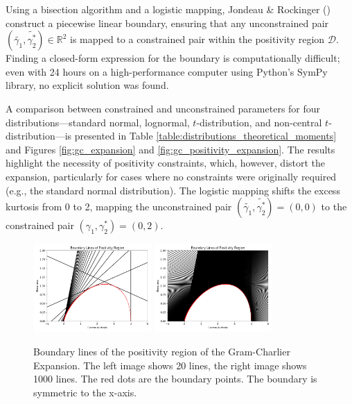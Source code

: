 Using a bisection algorithm and a logistic mapping, Jondeau \& Rockinger (\citeyear{jondeauGramCharlierDensities2001}) construct a piecewise linear boundary, ensuring that any unconstrained pair $(\tilde{\gamma_1}, \tilde{\gamma_2^*}) \in \mathbb{R}^2$ is mapped to a constrained pair within the positivity region $\mathcal{D}$. Finding a closed-form expression for the boundary is computationally difficult; even with 24 hours on a high-performance computer using Python's SymPy library, no explicit solution was found.

A comparison between constrained and unconstrained parameters for four distributions—standard normal, lognormal, $t$-distribution, and non-central $t$-distribution—is presented in Table \ref{table:distributions_theoretical_moments} and Figures \ref{fig:gc_expansion} and \ref{fig:gc_positivity_expansion}. The results highlight the necessity of positivity constraints, which, however, distort the expansion, particularly for cases where no constraints were originally required (e.g., the standard normal distribution). The logistic mapping shifts the excess kurtosis from 0 to 2, mapping the unconstrained pair $(\tilde{\gamma_1}, \tilde{\gamma_2^*}) = (0,0)$ to the constrained pair $(\gamma_1, \gamma_2^*) = (0,2)$.

\begin{figure}[h]
    \centering
    \includegraphics[width=0.4\textwidth]{img/gc_positivity_boundary_lines_20.png}
    \includegraphics[width=0.4\textwidth]{img/gc_positivity_boundary_lines_1000.png}
    \caption{Boundary lines of the positivity region of the Gram-Charlier Expansion. The left image shows 20 lines, the right image shows 1000 lines. The red dots are the boundary points. The boundary is symmetric to the x-axis.}
    \label{fig:gram_charlier_boundary_lines_20_vs_1000}
\end{figure}

